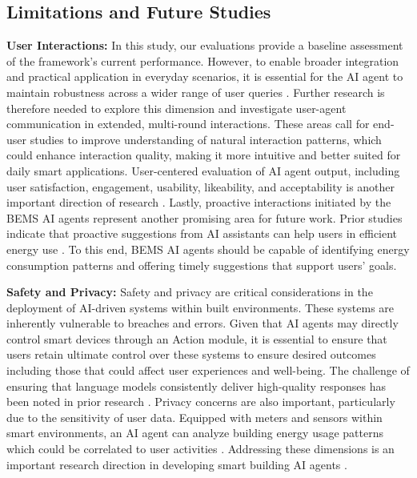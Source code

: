 \documentclass[final,3p,times]{elsarticle}
\begin{document}
\subsection{Limitations and Future Studies}


\textbf{User Interactions:} In this study, our evaluations provide a baseline assessment of the framework's current performance. However, to enable broader integration and practical application in everyday scenarios, it is essential for the AI agent to maintain robustness across a wider range of user queries \cite{chang2024survey}. Further research is therefore needed to explore this dimension and investigate user-agent communication in extended, multi-round interactions. These areas call for end-user studies to improve understanding of natural interaction patterns, which could enhance interaction quality, making it more intuitive and better suited for daily smart applications. User-centered evaluation of AI agent output, including user satisfaction, engagement, usability, likeability, and acceptability is another important direction of research \cite{giudici2024designing, chang2024survey}. Lastly, proactive interactions initiated by the BEMS AI agents represent another promising area for future work. Prior studies indicate that proactive suggestions from AI assistants can help users in efficient energy use \cite{he2022ai}. To this end, BEMS AI agents should be capable of identifying energy consumption patterns and offering timely suggestions that support users' goals.

\textbf{Safety and Privacy:} Safety and privacy are critical considerations in the deployment of AI-driven systems within built environments. These systems are inherently vulnerable to breaches and errors. Given that AI agents may directly control smart devices through an Action module, it is essential to ensure that users retain ultimate control over these systems to ensure desired outcomes including those that could affect user experiences and well-being. The challenge of ensuring that language models consistently deliver high-quality responses has been noted in prior research \cite{chang2024survey}. Privacy concerns are also important, particularly due to the sensitivity of user data. Equipped with meters and sensors within smart environments, an AI agent can analyze building energy usage patterns which could be correlated to user activities \cite{juttner2024chatanalysis}. Addressing these dimensions is an important research direction in developing smart building AI agents \cite{ramokapane2022privacy}.
\end{document}
